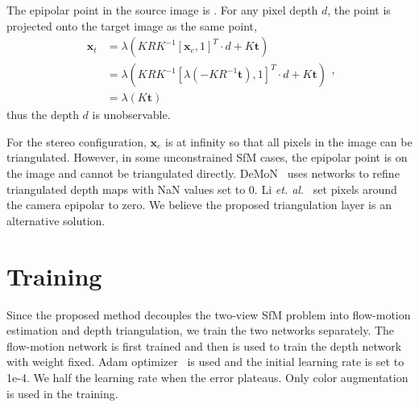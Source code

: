 \documentclass[letterpaper, 10 pt, conference]{ieeeconf}  %
\begin{document}
The epipolar point in the source image is . For any pixel depth $d$, the point is projected onto the target image as the same point,
\begin{equation}
\begin{aligned}
\mathbf{x}_t & = \lambda(KRK^{-1}[\mathbf{x}_e, 1]^T \cdot d + K\mathbf{t}) \\
                 & = \lambda(KRK^{-1}[\lambda(-KR^{-1}\mathbf{t}), 1]^T \cdot d + K\mathbf{t}) \\
                 & = \lambda(K\mathbf{t})
\end{aligned},
\end{equation}
thus the depth $d$ is unobservable.
 
For the stereo configuration, $\mathbf{x}_e$ is at infinity so that all pixels in the image can be triangulated. However, in some unconstrained SfM cases, the epipolar point is on the image and cannot be triangulated directly. DeMoN~\cite{demon} uses networks to refine triangulated depth maps with NaN values set to 0. Li \textit{et. al.}~\cite{freeze_people} set pixels around the camera epipolar to zero. We believe the proposed triangulation layer is an alternative solution.
 
 
 
 
 
\section{Training}
 
Since the proposed method decouples the two-view SfM problem into flow-motion estimation and depth triangulation, we train the two networks separately. The flow-motion network is first trained and then is used to train the depth network with weight fixed. Adam optimizer~\cite{adam} is used and the initial learning rate is set to 1e-4. We half the learning rate when the error plateaus. Only color augmentation is used in the training.
 
\end{document}
